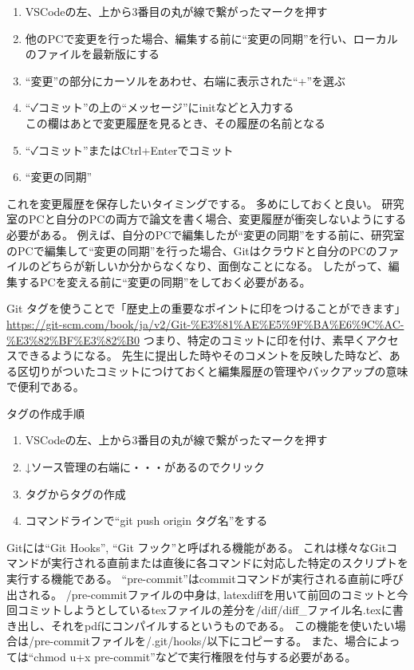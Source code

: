 \documentclass[uplatex, a4paper, dvipdfmx, 12pt]{jsreport}
\begin{document}
		\begin{enumerate}
			\item VSCodeの左、上から3番目の丸が線で繋がったマークを押す\label{VSCodeソース管理}
			\item 他のPCで変更を行った場合、編集する前に``変更の同期''を行い、ローカルのファイルを最新版にする
			\item ``変更''の部分にカーソルをあわせ、右端に表示された``+''を選ぶ
			\item ``✓コミット''の上の``メッセージ''にinitなどと入力する\\
					この欄はあとで変更履歴を見るとき、その履歴の名前となる
			\item ``✓コミット''またはCtrl+Enterでコミット
			\item ``変更の同期''
		\end{enumerate}
		これを変更履歴を保存したいタイミングでする。
		多めにしておくと良い。
		研究室のPCと自分のPCの両方で論文を書く場合、変更履歴が衝突しないようにする必要がある。
		例えば、自分のPCで編集したが``変更の同期''をする前に、研究室のPCで編集して``変更の同期''を行った場合、Gitはクラウドと自分のPCのファイルのどちらが新しいか分からなくなり、面倒なことになる。
		したがって、編集するPCを変える前に``変更の同期''をしておく必要がある。

		Git タグを使うことで「歴史上の重要なポイントに印をつけることができます」\url{https://git-scm.com/book/ja/v2/Git-%E3%81%AE%E5%9F%BA%E6%9C%AC-%E3%82%BF%E3%82%B0}
		つまり、特定のコミットに印を付け、素早くアクセスできるようになる。
		先生に提出した時やそのコメントを反映した時など、ある区切りがついたコミットにつけておくと編集履歴の管理やバックアップの意味で便利である。

		タグの作成手順
		\begin{enumerate}
			\item VSCodeの左、上から3番目の丸が線で繋がったマークを押す
			\item ↓ソース管理の右端に・・・があるのでクリック
			\item タグからタグの作成
			\item コマンドラインで``git push origin タグ名''をする
		\end{enumerate}

		Gitには``Git Hooks'', ``Git フック''と呼ばれる機能がある。
		これは様々なGitコマンドが実行される直前または直後に各コマンドに対応した特定のスクリプトを実行する機能である。
		``pre-commit''はcommitコマンドが実行される直前に呼び出される。
		/pre-commitファイルの中身は, latexdiffを用いて前回のコミットと今回コミットしようとしているtexファイルの差分を/diff/diff\_ファイル名.texに書き出し、それをpdfにコンパイルするというものである。
		この機能を使いたい場合は/pre-commitファイルを/.git/hooks/以下にコピーする。
		また、場合によっては``chmod u+x pre-commit''などで実行権限を付与する必要がある。
\end{document}
